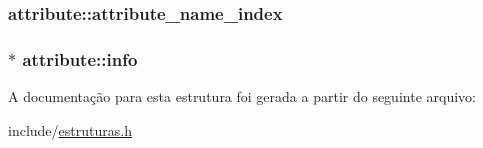\subsubsection[{\texorpdfstring{attribute\+\_\+name\+\_\+index}{attribute_name_index}}]{ attribute\+::attribute\+\_\+name\+\_\+index}\hypertarget{structattribute_a55761ad4a2ed18b8f88baf6ac062cb46}{}\label{structattribute_a55761ad4a2ed18b8f88baf6ac062cb46}
\subsubsection[{\texorpdfstring{info}{info}}]{$\ast$ attribute\+::info}\hypertarget{structattribute_ac749b125ccc9eda0cfe9deb4fe4aeda9}{}\label{structattribute_ac749b125ccc9eda0cfe9deb4fe4aeda9}


A documentação para esta estrutura foi gerada a partir do seguinte arquivo\+:\begin{DoxyCompactItemize}
\item 
include/\hyperlink{estruturas_8h}{estruturas.\+h}\end{DoxyCompactItemize}
